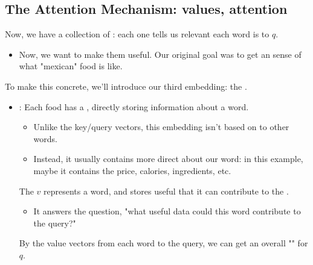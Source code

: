     \phantom{}

    \subsection{The Attention Mechanism: values, attention}

        Now, we have a collection of : each one tells us relevant each word is to $q$.

        \begin{itemize}
            \item Now, we want to make them useful. Our original goal was to get an  sense of what "mexican" food is like.
        \end{itemize}

        To make this concrete, we'll introduce our third embedding: the .

        \begin{itemize}
            \item {}: Each food has a , directly storing information about a word.

            \begin{itemize}
                \item Unlike the key/query vectors, this embedding isn't based on  to other words.

                \item Instead, it usually contains more direct  about our word: in this example, maybe it contains the price, calories, ingredients, etc.
                    \\
            \end{itemize}

            \begin{definition}
                The  $v$ represents a word, and stores useful  that it can contribute to the .

                \begin{itemize}
                    \item It answers the question, "what useful data could this word contribute to the query?"
                \end{itemize}

                By  the value vectors from each word  to the query, we can get an overall "" for $q$.
            \end{definition}
        \end{itemize}

